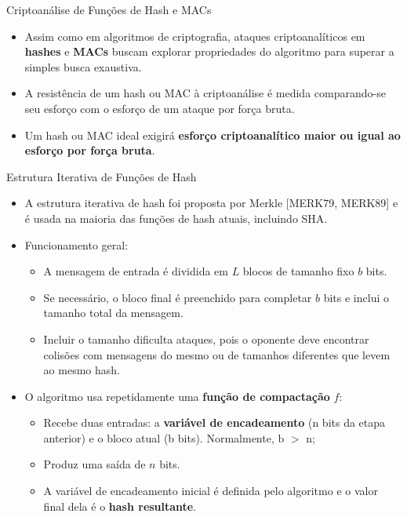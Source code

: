 \begin{frame}{Criptoanálise de Funções de Hash e MACs}
    \begin{itemize}
        \item Assim como em algoritmos de criptografia, ataques criptoanalíticos em \textbf{hashes} e \textbf{MACs} buscam explorar propriedades do algoritmo para superar a simples busca exaustiva.
        \item A resistência de um hash ou MAC à criptoanálise é medida comparando-se seu esforço com o esforço de um ataque por força bruta.
        \item Um hash ou MAC ideal exigirá \textbf{esforço criptoanalítico maior ou igual ao esforço por força bruta}.
    \end{itemize}
\end{frame}
\begin{frame}{Estrutura Iterativa de Funções de Hash}
    \begin{itemize}
        \item A estrutura iterativa de hash foi proposta por Merkle [MERK79, MERK89] e é usada na maioria das funções de hash atuais, incluindo SHA.
        \item Funcionamento geral:
        \begin{itemize}
            \item A mensagem de entrada é dividida em $L$ blocos de tamanho fixo $b$ bits.
            \item Se necessário, o bloco final é preenchido para completar $b$ bits e inclui o tamanho total da mensagem.
            \item Incluir o tamanho dificulta ataques, pois o oponente deve encontrar colisões com mensagens do mesmo ou de tamanhos diferentes que levem ao mesmo hash.
        \end{itemize}
        \item O algoritmo usa repetidamente uma \textbf{função de compactação} $f$:
        \begin{itemize}
            \item Recebe duas entradas: a \textbf{variável de encadeamento} (n bits da etapa anterior) e o bloco atual (b bits). Normalmente, b $>$ n;
            \item Produz uma saída de $n$ bits.
            \item A variável de encadeamento inicial é definida pelo algoritmo e o valor final dela é o \textbf{hash resultante}.
        \end{itemize}
    \end{itemize}
\end{frame}

